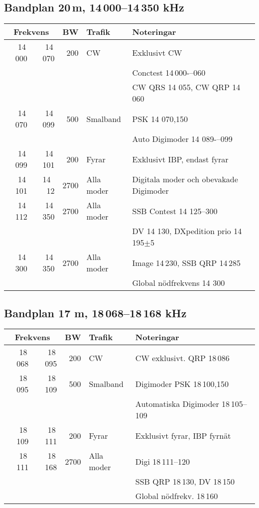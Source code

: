 \subsection{Bandplan 20\,m, 14\,000--14\,350 kHz}
\begin{tabular}{rrrll}
\multicolumn{2}{c}{\textbf{Frekvens}} & \textbf{BW} & \textbf{Trafik} & \textbf{Noteringar} \\ \hline
14\,000 & 14\,070 & 200  & CW         & Exklusivt CW                             \\
        &         &      &            & Conctest 14\,000-–060                    \\
        &         &      &            & CW QRS 14 055, CW QRP 14\,060            \\ \hline
14\,070 & 14\,099 & 500  & Smalband   & PSK 14 070,150                           \\
        &         &      &            & Auto Digimoder 14 089-–099               \\ \hline
14\,099 & 14\,101 & 200  & Fyrar      & Exklusivt IBP, endast fyrar              \\ \hline
14\,101 & 14 \,12 & 2700 & Alla moder & Digitala moder och obevakade Digimoder   \\ \hline
14\,112 & 14\,350 & 2700 & Alla moder & SSB Contest 14 125--300                  \\
        &         &      &            & DV 14 130, DXpedition prio 14\,195$\pm$5 \\ \hline
14\,300 & 14\,350 & 2700 & Alla moder & Image 14\,230, SSB QRP 14\,285           \\
        &         &      &            & Global nödfrekvens 14 300                \\ \hline
\end{tabular}

\subsection{Bandplan 17 m, 18\,068--18\,168 kHz}
\begin{tabular}{rrrll}
\multicolumn{2}{c}{\textbf{Frekvens}} & \textbf{BW} & \textbf{Trafik} & \textbf{Noteringar} \\ \hline

18\,068 & 18\,095 & 200  & CW         & CW exklusivt. QRP 18\,086             \\ \hline
18\,095 & 18\,109 & 500  & Smalband   & Digimoder PSK 18\,100,150             \\
        &         &      &            & Automatiska Digimoder 18\,105--109 \\ \hline
18\,109 & 18\,111 & 200  & Fyrar      & Exklusivt fyrar, IBP fyrnät           \\ \hline
18\,111 & 18\,168 & 2700 & Alla moder & Digi 18\,111--120                   \\
        &         &      &            & SSB QRP 18\,130, DV 18\,150           \\
        &         &      &            & Global nödfrekv. 18\,160              \\ \hline
\end{tabular}

